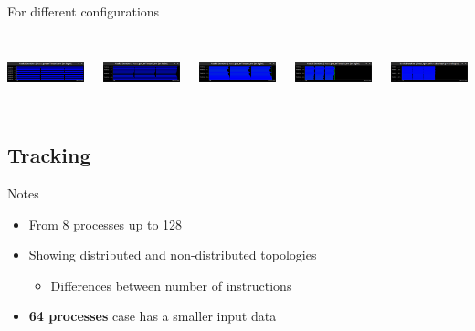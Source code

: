 \documentclass[aspectratio=169]{bredelebeamer}
\begin{document}
\begin{frame}{For different configurations}
\begin{columns}[c]
\includegraphics[height=1.5cm, width=4.5cm]{"./img/general/8x1x1"}


\includegraphics[height=1.5cm, width=4.5cm]{"./img/general/16x1x1"}


\includegraphics[height=1.5cm, width=4.5cm]{"./img/general/32x1x1"}


\includegraphics[height=1.5cm, width=4.5cm]{"./img/general/64x1x1"}


\includegraphics[height=1.5cm, width=4.5cm]{"./img/general/128x1x1"}



\end{columns}

\end{frame}


\subsection{Tracking}
\begin{frame}{Notes}
\begin{itemize}
	\item From 8 processes up to 128
	\item Showing distributed and non-distributed topologies
	\begin{itemize}
		\item Differences between number of instructions
	\end{itemize}
	\item \textbf{64 processes} case has a smaller input data 
\end{itemize}
\end{frame}
\end{document}

